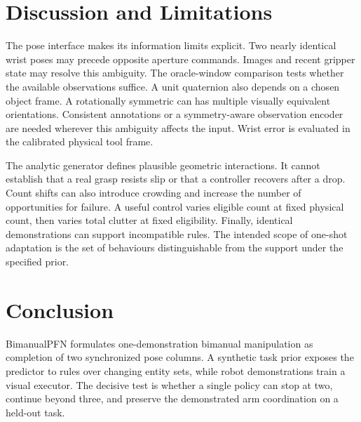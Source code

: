 \documentclass[letterpaper,10pt,conference]{ieeeconf}
\begin{document}
\section{Discussion and Limitations}
The pose interface makes its information limits explicit. Two nearly identical wrist poses may precede opposite aperture commands. Images and recent gripper state may resolve this ambiguity. The oracle-window comparison tests whether the available observations suffice. A unit quaternion also depends on a chosen object frame. A rotationally symmetric can has multiple visually equivalent orientations. Consistent annotations or a symmetry-aware observation encoder are needed wherever this ambiguity affects the input. Wrist error is evaluated in the calibrated physical tool frame.

The analytic generator defines plausible geometric interactions. It cannot establish that a real grasp resists slip or that a controller recovers after a drop. Count shifts can also introduce crowding and increase the number of opportunities for failure. A useful control varies eligible count at fixed physical count, then varies total clutter at fixed eligibility. Finally, identical demonstrations can support incompatible rules. The intended scope of one-shot adaptation is the set of behaviours distinguishable from the support under the specified prior.

\section{Conclusion}
BimanualPFN formulates one-demonstration bimanual manipulation as completion of two synchronized pose columns. A synthetic task prior exposes the predictor to rules over changing entity sets, while robot demonstrations train a visual executor. The decisive test is whether a single policy can stop at two, continue beyond three, and preserve the demonstrated arm coordination on a held-out task.
\end{document}
